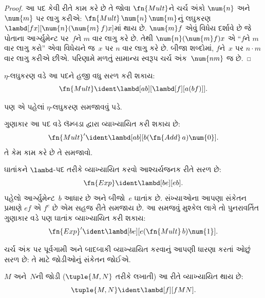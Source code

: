 \begin{proof}
આ પદ કેવી રીતે કામ કરે છે તે જોવા $\fn{Mult}$ને ચર્ચ
અંકો $\num{n}$ અને $\num{m}$ પર લાગુ કરીએ:
$\fn{Mult} \, \num{n} \, \num{m}$નું લઘુકરણ
$\lambd[fx][\num{n}(\num{m}\, f)x]$માં થાય છે.
$\num{m} f$ એવું વિધેય દર્શાવે છે જે પોતાના
આર્ગ્યુમેન્ટ પર~$f$ને $m$ વાર લાગુ કરે છે. તેથી
$\num{n} (\num{m} f) x$ એ ``$f$ને $m$
વાર લાગુ કરો'' એવા વિધેયને જ~$x$ પર $n$ વાર
લાગુ કરે છે. બીજા શબ્દોમાં, $f$ને~$x$ પર
$n\cdot m$ વાર લાગુ કરીએ છીએ. પરિણામે મળતું
સામાન્ય સ્વરૂપ ચર્ચ અંક~$\num{nm}$ જ છે.
\end{proof}

\begin{editorial}
$\eta$-લઘુકરણ વડે આ પદને હજી વધુ સરળ કરી શકાય:
\[
  \fn{Mult} \ident \lambd[ab][\lambd[f][a (b f)]].
\]

પણ એ પહેલાં $\eta$-લઘુકરણ સમજાવવું પડે.
\end{editorial}

\begin{prob}
ગુણાકાર આ પદ વડે લૅમ્બડા દ્વારા વ્યાખ્યાયિત કરી શકાય છે:
\[
  \fn{Mult}' \ident \lambd[ab][b (\fn{Add}\, a) \num{0}].
\]
તે કેમ કામ કરે છે તે સમજાવો.
\end{prob}

ઘાતાંકને $\lambd$-પદ તરીકે વ્યાખ્યાયિત કરવો
આશ્ચર્યજનક રીતે સરળ છે:
\[
  \fn{Exp} \ident \lambd[be][e b].
\]
પહેલો આર્ગ્યુમેન્ટ~$b$ આધાર છે અને બીજો~$e$
ઘાતાંક છે. સંખ્યાઓના આપણા સંકેતન પ્રમાણે
$e f$ એ $f^e$ છે એમ સહજ રીતે સમજાય છે.
આ સમજવું મુશ્કેલ લાગે તો પુનરાવર્તિત ગુણાકાર
વડે પણ ઘાતાંક વ્યાખ્યાયિત કરી શકાય:
\[
  \fn{Exp}' \ident \lambd[be][e (\fn{Mult}\, b) \num{1}].
\]

ચર્ચ અંક પર પૂર્વગામી અને બાદબાકી વ્યાખ્યાયિત
કરવાનું આપણી ધારણા કરતાં ઓછું સરળ છે:
તે માટે જોડીઓનું સંકેતન જોઈએ.
\endgroup

\begingroup
\makeatletter{}\makeatother

\label{guunit:OLP-0376}


\begin{defn}
$M$ અને~$N$ની જોડી ($\tuple{M,N}$ તરીકે લખાતી)
આ રીતે વ્યાખ્યાયિત થાય છે:
\[
\tuple{M,N} \ident \lambd[f][fMN].
\]
\end{defn}
  
